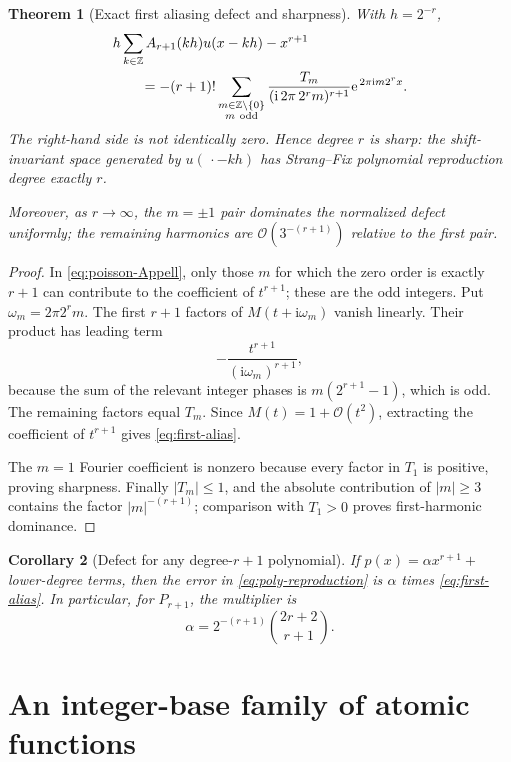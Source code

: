 \documentclass[11pt,oneside]{article}
\newtheorem{theorem}{Theorem}[section]
\newtheorem{corollary}[theorem]{Corollary}
\theoremstyle{definition}
\theoremstyle{remark}
\newcommand{\Z}{\mathbb Z}
\newcommand{\e}{\mathrm e}
\newcommand{\ii}{\mathrm i}
\newcommand{\bigO}{\mathcal O}
\begin{document}
\begin{theorem}[Exact first aliasing defect and sharpness]
\label{thm:alias-defect}
With \(h=2^{-r}\),
\begin{align}
 &h\sum_{k\in\Z}A_{r+1}(kh)u(x-kh)-x^{r+1}
 \notag\\
 &\qquad=
 -(r+1)!
 \sum_{\substack{m\in\Z\setminus\{0\}\\m\ {\rm odd}}}
 \frac{T_m}
      {(\ii\,2\pi\,2^r m)^{r+1}}
 \e^{\,2\pi\ii m2^rx}.
 \label{eq:first-alias}
\end{align}
The right-hand side is not identically zero.  Hence degree \(r\) is sharp:
the shift-invariant space generated by \(u(\,\cdot-kh)\) has Strang--Fix
polynomial reproduction degree exactly \(r\).

Moreover, as \(r\to\infty\), the \(m=\pm1\) pair dominates the normalized
defect uniformly; the remaining harmonics are
\(\bigO(3^{-(r+1)})\) relative to the first pair.
\end{theorem}

\begin{proof}
In \eqref{eq:poisson-Appell}, only those \(m\) for which the zero order is
exactly \(r+1\) can contribute to the coefficient of \(t^{r+1}\); these are
the odd integers.  Put \(\omega_m=2\pi2^rm\).  The first \(r+1\) factors of
\(M(t+\ii\omega_m)\) vanish linearly.  Their product has leading term
\[
 -\frac{t^{r+1}}{(\ii\omega_m)^{r+1}},
\]
because the sum of the relevant integer phases is
\(m(2^{r+1}-1)\), which is odd.  The remaining factors equal \(T_m\).
Since \(M(t)=1+\bigO(t^2)\), extracting the coefficient of \(t^{r+1}\)
gives \eqref{eq:first-alias}.

The \(m=1\) Fourier coefficient is nonzero because every factor in \(T_1\)
is positive, proving sharpness.  Finally \(|T_m|\leq1\), and the absolute
contribution of \(|m|\geq3\) contains the factor
\(|m|^{-(r+1)}\); comparison with \(T_1>0\) proves first-harmonic dominance.
\end{proof}

\begin{corollary}[Defect for any degree-\(r+1\) polynomial]
If \(p(x)=\alpha x^{r+1}+\) lower-degree terms, then the error in
\eqref{eq:poly-reproduction} is \(\alpha\) times
\eqref{eq:first-alias}.  In particular, for \(P_{r+1}\), the multiplier is
\[
 \alpha=2^{-(r+1)}\binom{2r+2}{r+1}.
\]
\end{corollary}

\section{An integer-base family of atomic functions}
\end{document}
